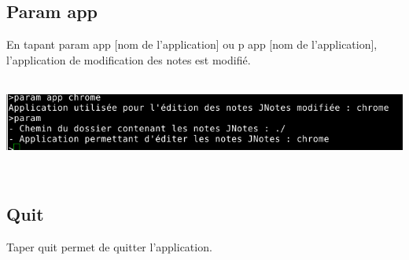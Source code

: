 \documentclass[a4paper,11pt]{article}
\begin{document}
		\subsection{Param app}
			En tapant param app [nom de l'application] ou p app [nom de l'application], l'application de modification des notes est modifié.\\
			\\
			\centerline{\includegraphics[scale=0.6]{Captures/paramapp.png}}
			\\	
		\subsection{Quit}
			Taper quit permet de quitter l'application.
		
	
\end{document}
